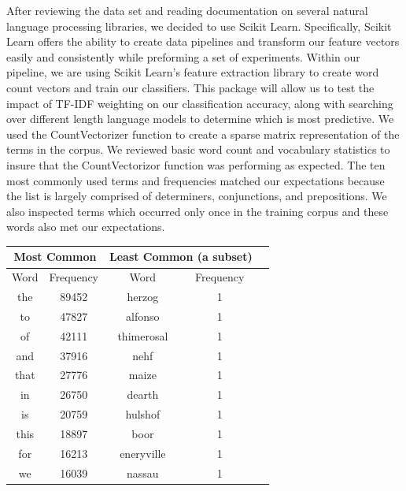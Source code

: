 \documentclass[a4paper, 11pt]{article}
\begin{document}
\noindent
After reviewing the data set and reading documentation on several natural language processing libraries, we decided to use Scikit Learn.  Specifically, Scikit Learn offers the ability to create data pipelines and transform our feature vectors easily and consistently while preforming a set of experiments. Within our pipeline, we are using Scikit Learn's feature extraction library to create word count vectors and train our classifiers. This package will allow us to test the impact of TF-IDF weighting on our classification accuracy, along with searching over different length language models to determine which is most predictive. We used the CountVectorizer function to create a sparse matrix representation of the terms in the corpus. We reviewed basic word count and vocabulary statistics to insure that the CountVectorizor function was performing as expected. The ten most commonly used terms and frequencies matched our expectations because the list is largely comprised of determiners, conjunctions, and prepositions. We also inspected terms which occurred only once in the training corpus and these words also met our expectations.
\begin{table}[h]
\centering
\label{Most and Least Common Words}
\begin{tabular}{|c|c|c|c|c|}
\multicolumn{2}{c}{Most Common} & \multicolumn{2}{l}{Least Common (a subset)} \\
\hline
Word                 & Frequency        &  Word & Frequency      \\
\hline
the                  & 89452                & herzog &1\\
to                  & 47827                 &   alfonso &1\\
of                    & 42111                  & thimerosal&1\\
and                   & 37916                    & nehf&1\\
that            & 27776                   & maize&1\\
in                   & 26750                   & dearth&1\\
is                   & 20759                   &hulshof&1\\
this                    & 18897                   & boor&1\\
for                   & 16213                    &eneryville& 1\\
we                & 16039                 & nassau & 1 \\
\hline
\end{tabular}
\end{table}
\end{document}
